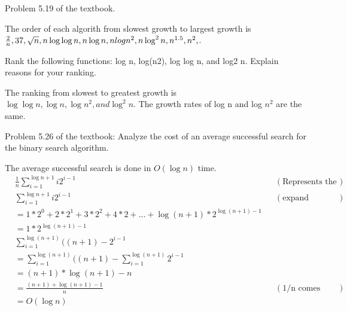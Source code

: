 \documentclass[10pt]{article}
\newenvironment{exercise}[2][Exercise]{\begin{trivlist}
\item[\hskip \labelsep {\bfseries #1}\hskip \labelsep {\bfseries #2.}]}{\end{trivlist}}
\newenvironment{solution}[2][Solution]{\begin{trivlist}
\item[\hskip \labelsep {\bfseries #1}\hskip \labelsep {\bfseries #2.}]}{\end{trivlist}}
\theoremstyle{definition}
\begin{document}
\begin{exercise}{(3a)} 
Problem 5.19 of the textbook.
\end{exercise}

\begin{solution}{(3a)}
The order of each algorith from slowest growth to largest growth is $\frac{2}{n}, 37, \sqrt n, n \log \log n, \\
n \log n, n log n^2, n \log^2 n, n^{1.5}, n^2, $.
\end{solution}


\begin{exercise}{(3b)} 
Rank the following functions: log n, log(n2), log log n, and log2 n. Explain reasons for
your ranking.
\end{exercise}

\begin{solution}{(3b)}
The ranking from slowest to greatest growth is $\log \log n, \log n, \log n^2, and \log^2 n$. The growth rates of log n and log $n^2$ are the same. 
\end{solution}

\begin{exercise}{(4)} %
Problem 5.26 of the textbook: Analyze the cost of an average successful search for the binary search
algorithm.
\end{exercise}

\begin{solution}{(4)}
The average successful search is done in $O(\log n)$ time.
\begin{align*}
&\frac{1}{n}\sum_{i=1}^{\log n + 1}i2^{i-1} && (\text{Represents the nodes at each level})\\
&\sum_{i=1}^{\log n + 1}i2^{i-1}  && (\text{expand summation})\\
& = 1*2^0 + 2*2^1 + 3*2^2 + 4 * 2 + ... + \log (n+1) * 2^{\log (n+1)-1}\\
& = 1 * 2^{\log (n+1) -1}\\
&\sum_{i=1}^{\log (n + 1)}((n+1) - 2^{i-1} \\
& = \sum_{i=1}^{\log (n + 1)}((n+1) - \sum_{i=1}^{\log (n + 1)}2^{i-1}\\
& = (n+1) * \log (n+1) - n \\
& = \frac {(n + 1) + \log (n+1) - 1}{n}  && (\text{1/n comes from original equation})\\
& = O(\log n)
\end{align*}
\end{solution}
\end{document}
